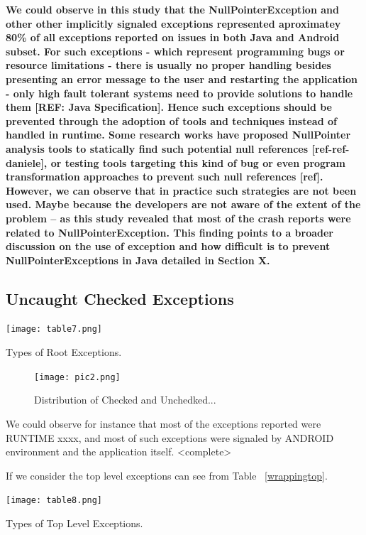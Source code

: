 \documentclass[conference]{IEEEtran}
\begin{document}
\textbf{We could observe in this study that the NullPointerException and other other implicitly signaled exceptions represented aproximatey 80\% of all exceptions reported on issues in both Java and Android subset.
For such exceptions - which represent programming bugs or resource limitations - there is usually no proper handling besides presenting an error message to the user and restarting the application - only high fault tolerant systems need to provide solutions to handle them [REF: Java Specification]. Hence such exceptions should be prevented through the adoption of tools and techniques instead of handled in runtime. Some research works have proposed NullPointer analysis tools to statically find such potential null references [ref-ref-daniele], or testing tools targeting this kind of bug or even program transformation approaches to prevent such null references [ref]. However, we can observe that in practice such strategies are not been used. Maybe because the developers are not aware of the extent of the problem – as this study revealed that most of the crash reports were related to NullPointerException. This finding points to a broader discussion on the use of exception and how difficult is to prevent NullPointerExceptions in Java detailed in Section X.}

\subsection{Uncaught Checked Exceptions}
\begin{table}
\centering
\texttt{[image: table7.png]}
\caption{Types of Root Exceptions.}
\label{fig:typeroottab}
\end{table}

\begin{figure}
\centering
\texttt{[image: pic2.png]}
\caption{Distribution of Checked and Unchedked...}
\label{fig:typeroot}
\end{figure}

We could observe for instance that most of the exceptions reported were RUNTIME xxxx, and most of such exceptions were signaled by ANDROID environment and the application itself. <complete> 

If we consider the top level exceptions can see from Table ~\ref{wrappingtop}. 

\begin{table}
\centering
\texttt{[image: table8.png]}
\caption{Types of Top Level Exceptions.}
\label{fig:typetop}
\end{table}
\end{document}
